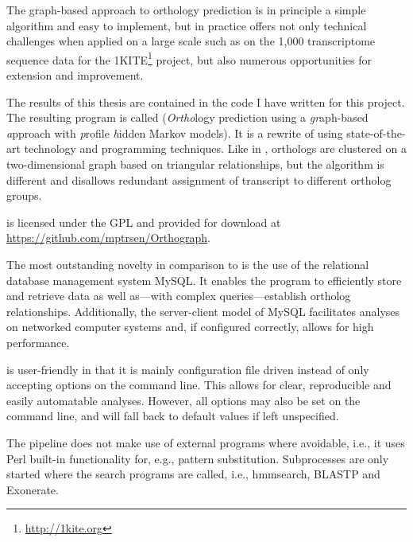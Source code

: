 The graph-based approach to orthology prediction is in principle a simple
algorithm and easy to implement, but in practice offers not only technical
challenges when applied on a large scale such as on the 1,000 transcriptome
sequence data for the 1KITE\footnote{\url{http://1kite.org}} project, but also
numerous opportunities for extension and improvement. 

The results of this thesis are contained in the code I have written for this
project. The resulting program is called \pname (\emph{Ortho}logy prediction
using a \emph{gr}aph-based \emph{a}pproach with \emph{p}rofile \emph{h}idden
Markov models). It is a rewrite of \hamstr using state-of-the-art technology and
programming techniques. Like in \hamstr, orthologs are clustered on a
two-dimensional graph based on triangular relationships, but the algorithm is
different and disallows redundant assignment of transcript to different ortholog
groups.

\pname is licensed under the GPL and provided for download at
\url{https://github.com/mptrsen/Orthograph}. 

The most outstanding novelty in comparison to \hamstr is the use of the
relational database management system MySQL. It enables the program to
efficiently store and retrieve data as well as---with complex 
queries---establish ortholog relationships. Additionally, the server-client
model of MySQL facilitates analyses on networked computer systems and, if
configured correctly, allows for high performance.

\pname is user-friendly in that it is mainly configuration file driven instead
of only accepting options on the command line. This allows for clear,
reproducible and easily automatable analyses. However, all options may also be
set on the command line, and will fall back to default values if left
unspecified.

The pipeline does not make use of external programs where avoidable, i.e., it
uses Perl built-in functionality for, e.g., pattern substitution. Subprocesses
are only started where the search programs are called, i.e., hmmsearch, BLASTP
and Exonerate. 
